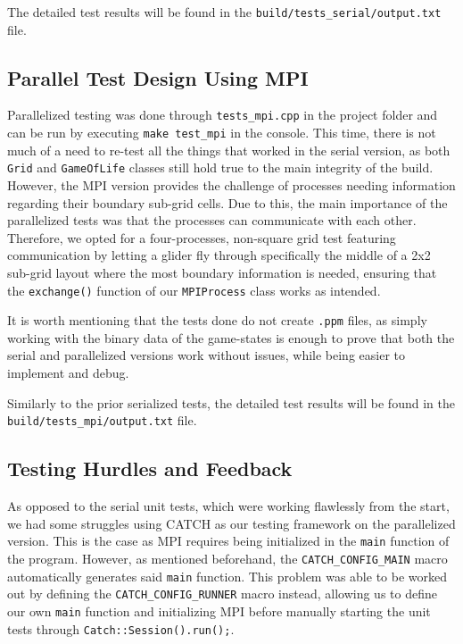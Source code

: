 \documentclass[11pt]{article}
\begin{document}
The detailed test results will be found in the \texttt{build/tests\_serial/output.txt} file.

\subsection{Parallel Test Design Using MPI}
Parallelized testing was done through \texttt{tests\_mpi.cpp} in the project folder and can be run by executing \texttt{make test\_mpi} in the console. This time, there is not much of a need to re-test all the things that worked in the serial version, as both \texttt{Grid} and \texttt{GameOfLife} classes still hold true to the main integrity of the build. However, the MPI version provides the challenge of processes needing information regarding their boundary sub-grid cells. Due to this, the main importance of the parallelized tests was that the processes can communicate with each other. Therefore, we opted for a four-processes, non-square grid test featuring communication by letting a glider fly through specifically the middle of a 2x2 sub-grid layout where the most boundary information is needed, ensuring that the \texttt{exchange()} function of our \texttt{MPIProcess} class works as intended. 

It is worth mentioning that the tests done do not create \texttt{.ppm} files, as simply working with the binary data of the game-states is enough to prove that both the serial and parallelized versions work without issues, while being easier to implement and debug.

Similarly to the prior serialized tests, the detailed test results will be found in the \\\texttt{build/tests\_mpi/output.txt} file.

\subsection{Testing Hurdles and Feedback}
As opposed to the serial unit tests, which were working flawlessly from the start, we had some struggles using CATCH as our testing framework on the parallelized version. This is the case as MPI requires being initialized in the \texttt{main} function of the program. However, as mentioned beforehand, the \texttt{CATCH\_CONFIG\_MAIN} macro automatically generates said \texttt{main} function. This problem was able to be worked out by defining the \texttt{CATCH\_CONFIG\_RUNNER} macro instead, allowing us to define our own \texttt{main} function and initializing MPI before manually starting the unit tests through \texttt{Catch::Session().run();}.
\end{document}
